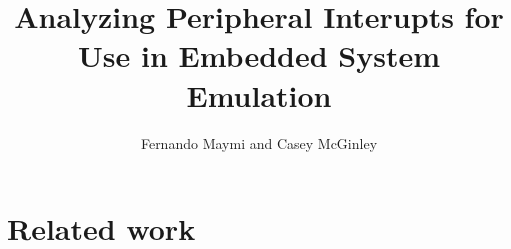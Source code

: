 \documentclass[letterpaper, 10 pt, conference]{ieeeconf}
\title{\LARGE \bf
Analyzing Peripheral Interupts for Use in Embedded System Emulation
}
\author{Fernando Maymi and Casey McGinley}
\begin{document}
\maketitle
\thispagestyle{empty}
\pagestyle{empty}


\section{Related work}
\end{document}
